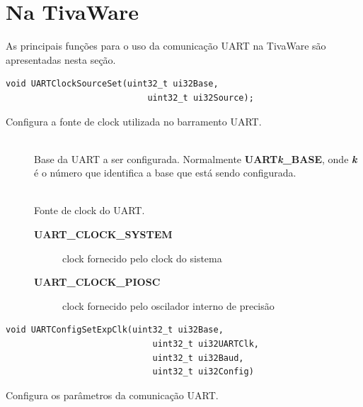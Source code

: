 \section{Na TivaWare}

As principais funções para o uso da comunicação UART na TivaWare são apresentadas nesta seção.

\begin{lstlisting}[style=funcao]
	void UARTClockSourceSet(uint32_t ui32Base,
							uint32_t ui32Source);
\end{lstlisting}

Configura a fonte de clock utilizada no barramento UART.

\begin{description}
	\item []\hfill \\
	Base da UART a ser configurada. Normalmente \textbf{UART\emph{k}\_BASE}, onde \textbf{\emph{k}} é o número que identifica a base que está sendo configurada.
	
	\item []\hfill \\
	Fonte de clock do UART.
	\begin{description}
		\item [\textbf{UART\_CLOCK\_SYSTEM}] clock fornecido pelo clock do sistema
		\item [\textbf{UART\_CLOCK\_PIOSC}] clock fornecido pelo oscilador interno de precisão
	\end{description}
\end{description}

\begin{lstlisting}[style=funcao]
	void UARTConfigSetExpClk(uint32_t ui32Base,
							 uint32_t ui32UARTClk,
							 uint32_t ui32Baud,
							 uint32_t ui32Config)
\end{lstlisting}

Configura os parâmetros da comunicação UART.

